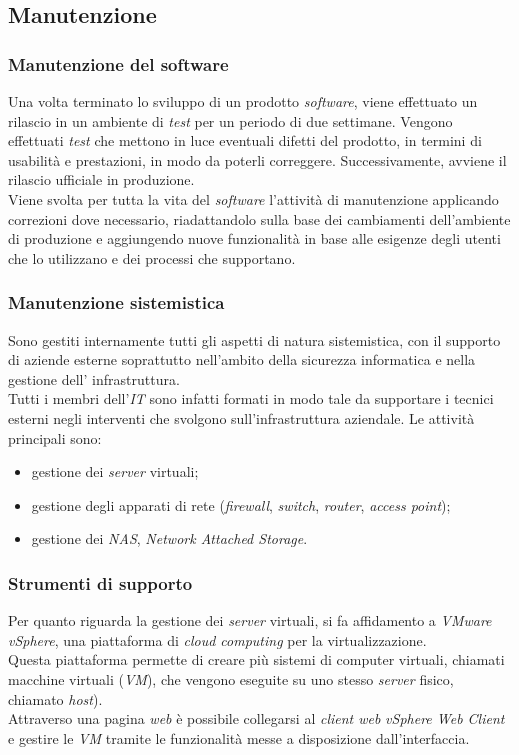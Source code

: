 
\subsection{Manutenzione}
 
 \subsubsection{Manutenzione del software}
Una volta terminato lo sviluppo di un prodotto \textit{software}, viene effettuato un rilascio in un ambiente di \textit{test} per un periodo di due settimane. Vengono effettuati \textit{test} che mettono in luce eventuali difetti del prodotto, in termini di usabilità e prestazioni, in modo da poterli correggere. Successivamente, avviene il rilascio ufficiale in produzione.\\
Viene svolta per tutta la vita del \textit{software} l'attività di manutenzione applicando correzioni dove necessario, riadattandolo sulla base dei cambiamenti dell'ambiente di produzione e aggiungendo nuove funzionalità in base alle esigenze degli utenti che lo utilizzano e dei processi che supportano.
 
 \subsubsection{Manutenzione sistemistica}
Sono gestiti internamente tutti gli aspetti di natura sistemistica, con il supporto di aziende esterne soprattutto nell'ambito della sicurezza informatica e nella gestione dell' infrastruttura.\\ Tutti i membri dell'\textit{IT} sono infatti formati in modo tale da supportare i tecnici esterni negli interventi che svolgono sull'infrastruttura aziendale. Le attività principali sono:
\begin{itemize}
	\item gestione dei \textit{server} virtuali;
	\item gestione degli apparati di rete (\textit{firewall}, \textit{switch}, \textit{router}, \textit{access point});
	\item gestione dei \textit{NAS}, \textit{Network Attached Storage}.
\end{itemize}

\subsubsection{Strumenti di supporto}
Per quanto riguarda la gestione dei \textit{server} virtuali, si fa affidamento a \textit{VMware vSphere}, una piattaforma di \textit{cloud computing} per la virtualizzazione.\\ Questa piattaforma permette di creare più sistemi di computer virtuali, chiamati macchine virtuali (\textit{VM}), che vengono eseguite su uno stesso \textit{server} fisico, chiamato \textit{host}).\\ Attraverso una pagina \textit{web} è possibile collegarsi al \textit{client web} \textit{vSphere Web Client} e gestire le \textit{VM} tramite le funzionalità messe a disposizione dall'interfaccia.


